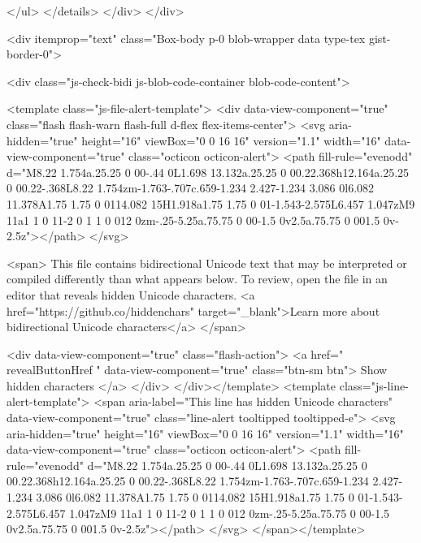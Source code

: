         </ul>
      </details>
    </div>
</div>


      
    <div itemprop="text" class="Box-body p-0 blob-wrapper data type-tex  gist-border-0">

        
<div class="js-check-bidi js-blob-code-container blob-code-content">

  <template class="js-file-alert-template">
  <div data-view-component="true" class="flash flash-warn flash-full d-flex flex-items-center">
  <svg aria-hidden="true" height="16" viewBox="0 0 16 16" version="1.1" width="16" data-view-component="true" class="octicon octicon-alert">
    <path fill-rule="evenodd" d="M8.22 1.754a.25.25 0 00-.44 0L1.698 13.132a.25.25 0 00.22.368h12.164a.25.25 0 00.22-.368L8.22 1.754zm-1.763-.707c.659-1.234 2.427-1.234 3.086 0l6.082 11.378A1.75 1.75 0 0114.082 15H1.918a1.75 1.75 0 01-1.543-2.575L6.457 1.047zM9 11a1 1 0 11-2 0 1 1 0 012 0zm-.25-5.25a.75.75 0 00-1.5 0v2.5a.75.75 0 001.5 0v-2.5z"></path>
</svg>
  
    <span>
      This file contains bidirectional Unicode text that may be interpreted or compiled differently than what appears below. To review, open the file in an editor that reveals hidden Unicode characters.
      <a href="https://github.co/hiddenchars" target="_blank">Learn more about bidirectional Unicode characters</a>
    </span>


  <div data-view-component="true" class="flash-action">        <a href="{{ revealButtonHref }}" data-view-component="true" class="btn-sm btn">    Show hidden characters
</a>
</div>
</div></template>
<template class="js-line-alert-template">
  <span aria-label="This line has hidden Unicode characters" data-view-component="true" class="line-alert tooltipped tooltipped-e">
    <svg aria-hidden="true" height="16" viewBox="0 0 16 16" version="1.1" width="16" data-view-component="true" class="octicon octicon-alert">
    <path fill-rule="evenodd" d="M8.22 1.754a.25.25 0 00-.44 0L1.698 13.132a.25.25 0 00.22.368h12.164a.25.25 0 00.22-.368L8.22 1.754zm-1.763-.707c.659-1.234 2.427-1.234 3.086 0l6.082 11.378A1.75 1.75 0 0114.082 15H1.918a1.75 1.75 0 01-1.543-2.575L6.457 1.047zM9 11a1 1 0 11-2 0 1 1 0 012 0zm-.25-5.25a.75.75 0 00-1.5 0v2.5a.75.75 0 001.5 0v-2.5z"></path>
</svg>
</span></template>

